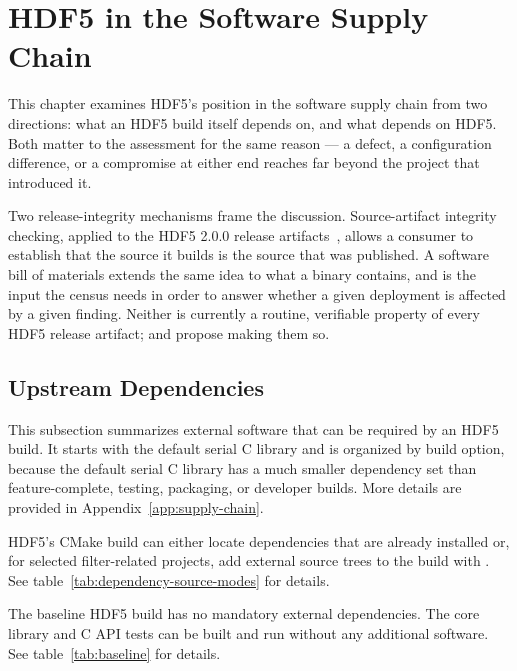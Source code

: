\documentclass[../main.tex]{subfiles}
\begin{document}
\section{HDF5 in the Software Supply Chain}
\label{sec:supply-chain}


This chapter examines HDF5's position in the software supply chain from two
directions: what an HDF5 build itself depends on, and what depends on HDF5.
Both matter to the assessment for the same reason --- a defect, a
configuration difference, or a compromise at either end reaches far beyond the
project that introduced it.

Two release-integrity mechanisms frame the discussion. Source-artifact
integrity checking, applied to the HDF5 2.0.0 release
artifacts~\cite{prisupp-2204}, allows a consumer to establish that the source
it builds is the source that was published. A software bill of materials
extends the same idea to what a binary contains, and is the input the
 census needs in order to answer whether a given deployment is
affected by a given finding. Neither is currently a routine, verifiable
property of every HDF5 release artifact;  and 
propose making them so.

\subsection{Upstream Dependencies}

This subsection summarizes external software that can be required by an HDF5
build. It starts with the default serial C library and is organized by build
option, because the default serial C library has a much smaller dependency
set than feature-complete, testing, packaging, or developer builds. More
details are provided in Appendix~\ref{app:supply-chain}.

HDF5's CMake build can either locate dependencies that are already installed or,
for selected filter-related projects, add external source trees to the build with
. See table~\ref{tab:dependency-source-modes} for details. 

The baseline HDF5 build has no mandatory external dependencies.
The core library and C API tests can be built and run without any additional
software. See table~\ref{tab:baseline} for details.
\end{document}
